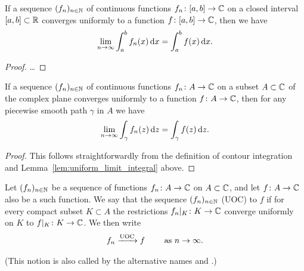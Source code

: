 \begin{lemma}
  \label{lem:uniform_limit_integral}
  If a sequence $(f_n)_{n \in \mathbb{N}}$ of continuous functions
  $f_n \colon [a,b] \to \mathbb{C}$ on a closed interval $[a,b] \subset \mathbb{R}$
  converges uniformly to a function
  $f \colon [a,b] \to \mathbb{C}$, then we have
  \begin{align*}
    \lim_{n \to \infty} \int_a^b f_n(x) \, \mathrm{d} x
      = \int_a^b f(x) \, \mathrm{d} x .
  \end{align*}
\end{lemma}
\begin{proof}
  \ldots
\end{proof}

\begin{corollary}
  \label{cor:uniform_limit_contour_integral}
  If a sequence $(f_n)_{n \in \mathbb{N}}$ of continuous functions
  $f_n \colon A \to \mathbb{C}$ on a subset $A \subset \mathbb{C}$  of the complex plane
  converges uniformly to a function
  $f \colon A \to \mathbb{C}$, then for any piecewise smooth path $\gamma$
  in $A$ we have
  \begin{align*}
    \lim_{n \to \infty} \int_\gamma f_n(z) \, \mathrm{d} z
      = \int_\gamma f(z) \, \mathrm{d} z .
  \end{align*}
\end{corollary}
\begin{proof}
  This follows straightforwardly from the definition of contour integration
  and Lemma~\ref{lem:uniform_limit_integral} above.
\end{proof}

\begin{definition}
  \label{def:uoc_limit}
  Let $(f_n)_{n \in \mathbb{N}}$ be a sequence of functions
  $f_n \colon A \to \mathbb{C}$ on $A \subset \mathbb{C}$, and
  let $f \colon A \to \mathbb{C}$ also be a such function. We say
  that the sequence   $(f_n)_{n \in \mathbb{N}}$  (UOC) to $f$ if for every compact subset $K \subset A$
  the restrictions $f_n|_K \colon K \to \mathbb{C}$ converge
  uniformly on $K$ to $f|_K \colon K \to \mathbb{C}$. We then write
  \begin{align*}
    f_n \xrightarrow{\mathrm{UOC}} f \qquad \text{ as } n \to \infty .
  \end{align*}

  (This notion is also called by the alternative names
   and .)
\end{definition}

